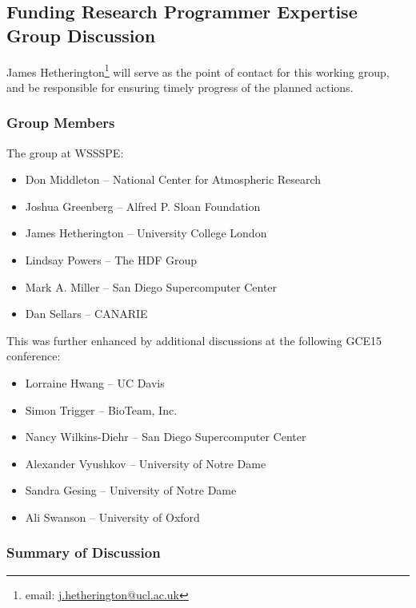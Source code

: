 \subsection{Funding Research Programmer Expertise Group Discussion}
\label{sec:appendix_funding_spec_expert}

James Hetherington\footnote{email:
\href{mailto:j.hetherington@ucl.ac.uk}{j.hetherington@ucl.ac.uk}} will serve as
the point of contact for this working group, and be responsible for ensuring
timely progress of the planned actions.

\subsubsection{Group Members}

The group at WSSSPE:

\begin{itemize}
\item Don Middleton -- National Center for Atmospheric Research
\item Joshua Greenberg -- Alfred P. Sloan Foundation
\item James Hetherington -- University College London
\item Lindsay Powers -- The HDF Group
\item Mark A. Miller -- San Diego Supercomputer Center
\item Dan Sellars -- CANARIE
\end{itemize}

This was further enhanced by additional discussions at the following
GCE15 conference:
  
\begin{itemize}
\item Lorraine Hwang -- UC Davis
\item Simon Trigger -- BioTeam, Inc.
\item Nancy Wilkins-Diehr -- San Diego Supercomputer Center
\item Alexander Vyushkov -- University of Notre Dame
\item Sandra Gesing -- University of Notre Dame
\item Ali Swanson -- University of Oxford

\end{itemize}

\subsubsection{Summary of Discussion}


